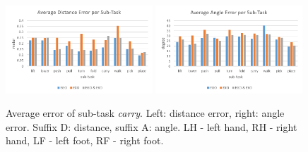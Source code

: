 \begin{figure}[H]
	\centering
	\includegraphics[width=0.49\textwidth]{figures/averageDistanceErrorPerSubTask.png}
	\includegraphics[width=0.49\textwidth]{figures/averageAngleErrorPerSubTask.png}
	\caption[Average error of sub-task\textit{carry}]{Average error of sub-task \textit{carry}. Left: distance error, right: angle error. Suffix D: distance, suffix A: angle. LH - left hand, RH - right hand, LF - left foot, RF - right foot.}
	\label{fig:avgErrorPerSubTask}
\end{figure}

